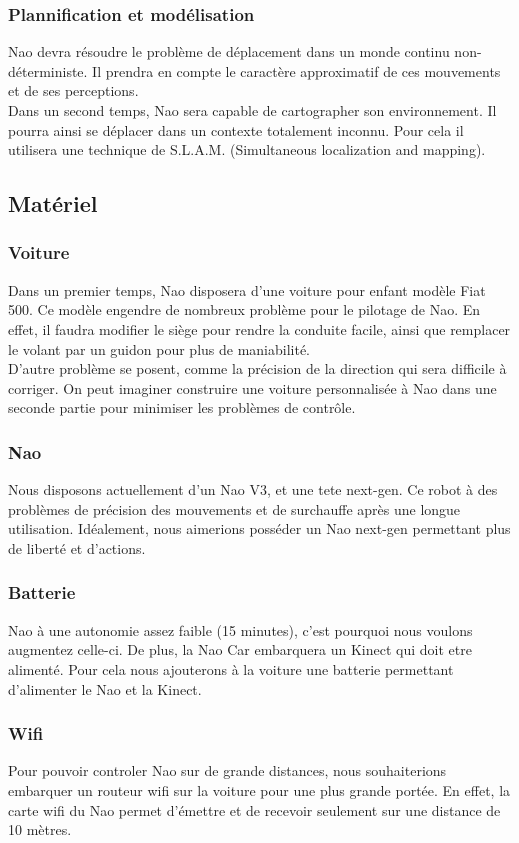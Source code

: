 \documentclass[11pt]{report} %
\begin{document}
			\subsubsection{Plannification et modélisation}	
				Nao devra résoudre le problème de déplacement dans un monde continu non-déterministe.
				Il prendra en compte le caractère approximatif de ces mouvements et de ses perceptions.\\
				Dans un second temps, Nao sera capable de cartographer son environnement. Il pourra ainsi se déplacer dans un contexte totalement inconnu. Pour cela il utilisera une technique de S.L.A.M. (Simultaneous localization and mapping).
		\subsection{Matériel}
			\subsubsection{Voiture}
			Dans un premier temps, Nao disposera d'une voiture pour enfant modèle Fiat 500. Ce modèle engendre de nombreux problème pour le pilotage de Nao. En effet, il faudra modifier le siège pour rendre la conduite facile, ainsi que remplacer le volant par un guidon pour plus de maniabilité.\\
			D'autre problème se posent, comme la précision de la direction qui sera difficile à corriger. On peut imaginer construire une voiture personnalisée à Nao dans une seconde partie pour minimiser les problèmes de contrôle.
			\subsubsection{Nao}
			Nous disposons actuellement d'un Nao V3, et une tete next-gen. Ce robot à des problèmes de précision des mouvements et de surchauffe après une longue utilisation. Idéalement, nous aimerions posséder un Nao next-gen permettant plus de liberté et d'actions.
			\subsubsection{Batterie}
			Nao à une autonomie assez faible (15 minutes), c'est pourquoi nous voulons augmentez celle-ci. De plus, la Nao Car embarquera un Kinect qui doit etre alimenté. Pour cela nous ajouterons à la voiture une batterie permettant d'alimenter le Nao et la Kinect.
			\subsubsection{Wifi}
			Pour pouvoir controler Nao sur de grande distances, nous souhaiterions embarquer un routeur wifi sur la voiture pour une plus grande portée. En effet, la carte wifi du Nao permet d'émettre et de recevoir seulement sur une distance de 10 mètres.
	\newpage
\end{document}
